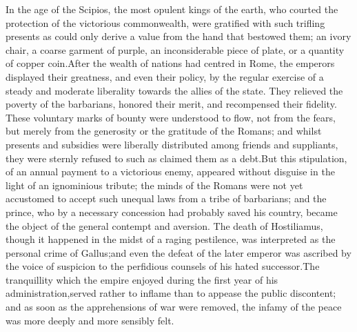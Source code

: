 In the age of the Scipios, the most opulent kings of the earth,
who courted the protection of the victorious commonwealth, were
gratified with such trifling presents as could only derive a
value from the hand that bestowed them; an ivory chair, a coarse
garment of purple, an inconsiderable piece of plate, or a
quantity of copper coin.\footnotemark[52] After the wealth of nations had
centred in Rome, the emperors displayed their greatness, and even
their policy, by the regular exercise of a steady and moderate
liberality towards the allies of the state. They relieved the
poverty of the barbarians, honored their merit, and recompensed
their fidelity. These voluntary marks of bounty were understood
to flow, not from the fears, but merely from the generosity or
the gratitude of the Romans; and whilst presents and subsidies
were liberally distributed among friends and suppliants, they
were sternly refused to such as claimed them as a debt.\footnotemark[53] But
this stipulation, of an annual payment to a victorious enemy,
appeared without disguise in the light of an ignominious tribute;
the minds of the Romans were not yet accustomed to accept such
unequal laws from a tribe of barbarians; and the prince, who by a
necessary concession had probably saved his country, became the
object of the general contempt and aversion. The death of
Hostiliamus, though it happened in the midst of a raging
pestilence, was interpreted as the personal crime of Gallus;\footnotemark[54]
and even the defeat of the later emperor was ascribed by the
voice of suspicion to the perfidious counsels of his hated
successor.\footnotemark[55] The tranquillity which the empire enjoyed during
the first year of his administration,\footnotemark[56] served rather to inflame
than to appease the public discontent; and as soon as the
apprehensions of war were removed, the infamy of the peace was
more deeply and more sensibly felt.




